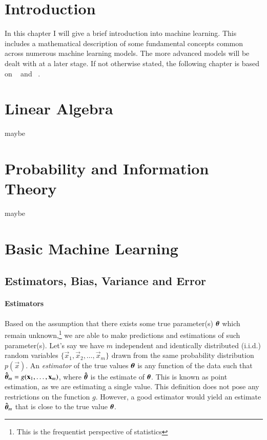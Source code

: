 %
%

\section{Introduction}
In this chapter I will give a brief introduction into machine learning. This includes a mathematical description of some fundamental concepts common across numerous machine learning models. The more advanced models will be dealt with at a later stage. If not otherwise stated, the following chapter is based on ~\cite{Goodfellow-et-al-2016} and ~\cite{hastie2009elements}. 

\section{Linear Algebra}
maybe

\section{Probability and Information Theory}
maybe

\section{Basic Machine Learning}

    \subsection{Estimators, Bias, Variance and Error}

        \paragraph{Estimators} 
        Based on the assumption that there exists some true parameter(s) $\boldsymbol{\theta}$ which remain unknown,\footnote{This is the frequentist perspective of statistics} we are able to make predictions and estimations of such parameter(s). Let's say we have $m$ independent and identically distributed (i.i.d.) random variables $\{\vec{x}_1, \vec{x}_2, \dots, \vec{x}_m\}$ drawn from the same probability distribution $p(\vec{x})$. An \textit{estimator} of the true values $\boldsymbol{\theta}$ is any function of the data such that $\boldsymbol{\hat{\theta}}_m = g(\mathbf{x}_1,\dots,\mathbf{x}_m)$, where $\boldsymbol{\hat{\theta}}$ is the estimate of $\boldsymbol{\theta}$. This is known as point estimation, as we are estimating a single value. This definition does not pose any restrictions on the function $g$. However, a good estimator would yield an estimate $\boldsymbol{\hat{\theta}}_m$ that is close to the true value $\boldsymbol{\theta}$. 
        
